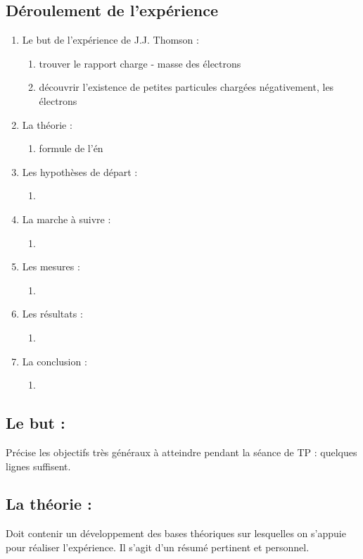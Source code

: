 \documentclass[../main.tex]{subfiles}
\begin{document}
\subsection{Déroulement de l'expérience}
\begin{enumerate}
    \item Le but de l'expérience de J.J. Thomson :
    \begin{enumerate}
        \item trouver le rapport charge - masse des électrons
        \item découvrir l'existence de petites particules chargées négativement, les électrons
    \end{enumerate}
    \item La théorie :
    \begin{enumerate}
        \item formule de l'én
    \end{enumerate}
    \item Les hypothèses de départ :
    \begin{enumerate}
        \item 
    \end{enumerate}
    \item La marche à suivre :
    \begin{enumerate}
        \item 
    \end{enumerate}
    \item Les mesures :
    \begin{enumerate}
        \item 
    \end{enumerate}
    \item Les résultats :
    \begin{enumerate}
        \item 
    \end{enumerate}
    \item La conclusion :
    \begin{enumerate}
        \item 
    \end{enumerate}
\end{enumerate}
\subsection{Le but :}
Précise les objectifs très généraux à atteindre pendant la séance de TP : quelques lignes suffisent.
\subsection{La théorie : }
Doit contenir un développement des bases théoriques sur lesquelles on s'appuie pour réaliser l'expérience. Il s'agit d'un résumé pertinent et personnel.
\end{document}
